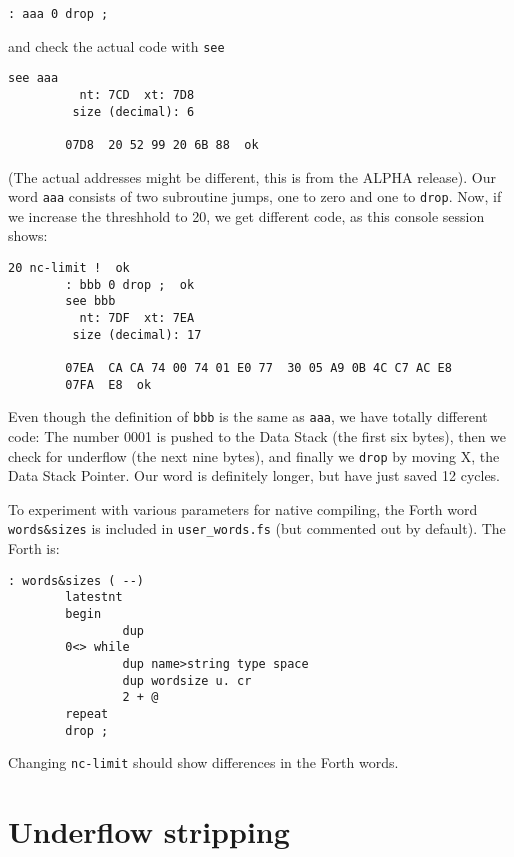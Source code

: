 \begin{lstlisting}[frame=lines]
        : aaa 0 drop ;
\end{lstlisting}

\noindent and check the actual code with \texttt{see}

\begin{lstlisting}[frame=lines]
        see aaa
          nt: 7CD  xt: 7D8
         size (decimal): 6

        07D8  20 52 99 20 6B 88  ok
\end{lstlisting}

\noindent (The actual addresses might be different, this is from the ALPHA release).  Our
word \texttt{aaa} consists of two subroutine jumps, one to zero and one to
\texttt{drop}. Now, if we increase the threshhold to 20, we get different code,
as this console session shows:

\begin{lstlisting}[frame=lines]
        20 nc-limit !  ok
        : bbb 0 drop ;  ok
        see bbb
          nt: 7DF  xt: 7EA
         size (decimal): 17

        07EA  CA CA 74 00 74 01 E0 77  30 05 A9 0B 4C C7 AC E8
        07FA  E8  ok
\end{lstlisting}

\noindent Even though the definition of \texttt{bbb} is the same as \texttt{aaa}, we have
totally different code: The number 0001 is pushed to the Data Stack (the first
six bytes), then we check for underflow (the next nine bytes),
and finally we \texttt{drop} by moving X, the Data Stack
Pointer. Our word is definitely longer, but have just saved 12 cycles.

To experiment with various parameters for native compiling, the Forth word
\texttt{words\&sizes} is included in \texttt{user\_words.fs} (but commented out 
by default). The Forth is:

\begin{lstlisting}[frame=lines]
: words&sizes ( --)
        latestnt
        begin
                dup
        0<> while
                dup name>string type space
                dup wordsize u. cr      
                2 + @
        repeat
        drop ;
\end{lstlisting}

\noindent Changing \texttt{nc-limit} should show differences in the Forth words.



\section{Underflow stripping}

